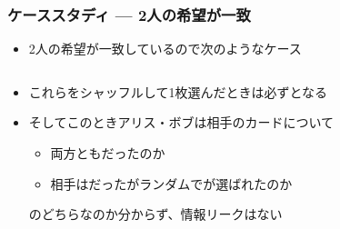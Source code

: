 \begin{frame}
  \frametitle{ケーススタディ --- 2人の希望が一致}

  \pause
  \begin{itemize}
    \item<+-> 2人の希望が一致しているので次のようなケース
      \begin{columns}
        \begin{column}{0.5\textwidth}
        \end{column}
        \begin{column}{0.5\textwidth}
        \end{column}
      \end{columns}

    \item<+-> これらをシャッフルして1枚選んだときは必ず\heartcard となる

    \item<+-> そしてこのときアリス・ボブは相手のカードについて
    \begin{itemize}
      \item 両方とも\heartcard だったのか
      \item 相手は\clubcard だったがランダムで\heartcard が選ばれたのか
    \end{itemize}
    のどちらなのか分からず、情報リークはない
  \end{itemize}
\end{frame}

